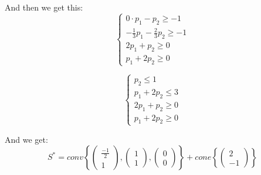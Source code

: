 And then we get this:
\begin{equation*}
    \begin{cases}
    0\cdot p_1 - p_2 \geq -1 \\
    -\frac{1}{3} p_1 - \frac{2}{3}p_2 \geq -1 \\
    2 p_1 + p_2 \geq 0 \\
    p_1 + 2p_2 \geq 0
    \end{cases}
\end{equation*}

\begin{equation*}
    \begin{cases}
    p_2 \leq 1 \\
    p_1 + 2p_2 \leq 3 \\
    2 p_1 + p_2 \geq 0 \\
    p_1 + 2p_2 \geq 0
    \end{cases}
\end{equation*}


And we get:
\begin{equation*}
    S^{*} = conv \left\{ 
        \begin{pmatrix} \frac{-1}{2}  \\ 1 \end{pmatrix}, 
        \begin{pmatrix} 1 \\ 1 \end{pmatrix},
        \begin{pmatrix} 0 \\ 0 \end{pmatrix} \right\} 
        + cone \left\{ 
        \begin{pmatrix} 2  \\ -1  \end{pmatrix} \right\}
\end{equation*}

\begin{center}
\end{center}

